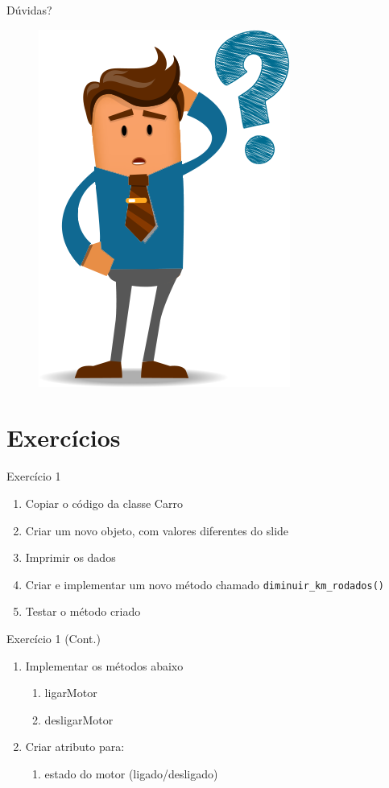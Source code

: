\documentclass{beamer}
\begin{document}
\begin{frame}{Dúvidas?}
    \begin{figure}
        \includegraphics[scale=0.35]{Theme/Logos/duvidas_frequentes.png}
    \end{figure}
\end{frame}

\section{Exercícios}

\begin{frame}{Exercício 1}
    \begin{enumerate}
        \item Copiar o código da classe Carro
        \item Criar um novo objeto, com valores diferentes do slide
        \item Imprimir os dados
        \item Criar e implementar um novo método chamado \texttt{diminuir\_km\_rodados()}
        \item Testar o método criado
    \end{enumerate}
\end{frame}

\begin{frame}{Exercício 1 (Cont.)}
    \begin{enumerate}
        \item Implementar os métodos abaixo
        \begin{enumerate}
            \item ligarMotor
            \item desligarMotor
        \end{enumerate}
        \item Criar atributo para:
        \begin{enumerate}
            \item estado do motor (ligado/desligado)
        \end{enumerate}
    \end{enumerate}
\end{frame}
\end{document}
